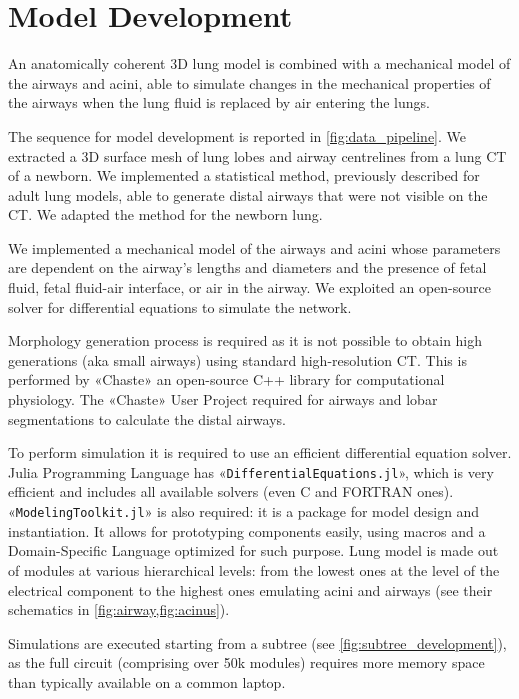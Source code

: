 \section{Model Development}
\label{sec:model_development}


An anatomically coherent 3D lung model is combined with a mechanical
model of the airways and acini, able to simulate changes in the
mechanical properties of the airways when the lung fluid is replaced
by air entering the lungs.

The sequence for model development is reported in
\cref{fig:data_pipeline}. We extracted a 3D surface mesh of lung lobes
and airway centrelines from a lung CT of a newborn. We implemented a
statistical method, previously described for adult lung models, able
to generate distal airways that were not visible on the CT. We adapted
the method for the newborn lung.

We implemented a mechanical model of the airways and acini whose
parameters are dependent on the airway's lengths and diameters and the
presence of fetal fluid, fetal fluid-air interface, or air in the
airway. We exploited an open-source solver for differential equations
to simulate the network.

Morphology generation process is required as it is not possible to
obtain high generations (aka small airways) using standard
high-resolution CT\cite{bordas2015}.  This is performed by «Chaste» an
open-source C++ library for computational physiology.  The «Chaste»
User Project required for airways and lobar segmentations to calculate
the distal airways.

To perform simulation it is required to use an efficient differential
equation solver.  Julia Programming Language\cite{juliadocs2024} has
«\texttt{DifferentialEquations.jl}», which is very efficient and
includes all available solvers (even C and FORTRAN
ones)\cite{diffeqdocs2024,rackauckas2017}.
«\texttt{ModelingToolkit.jl}»\cite{ma2021} is also required: it is a
package for model design and instantiation.  It allows for prototyping
components easily, using macros and a Domain-Specific Language
optimized for such purpose.  Lung model is made out of modules at
various hierarchical levels: from the lowest ones at the level of the
electrical component to the highest ones emulating acini and airways
(see their schematics in \cref{fig:airway,fig:acinus}).

Simulations are executed starting from a subtree (see
\cref{fig:subtree_development}), as the full circuit (comprising over
50k modules) requires more memory space than typically available on a
common laptop.










